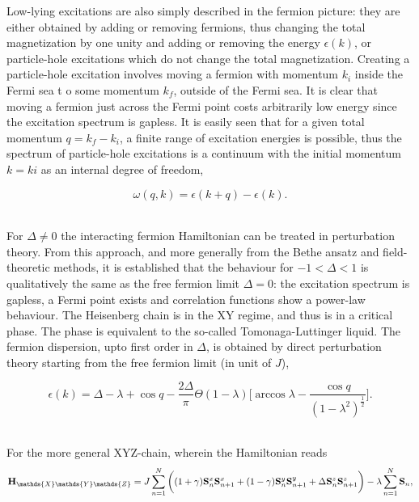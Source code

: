 \documentclass{homework}
\begin{document}
Low-lying excitations are also simply described in the fermion picture: they are either obtained by adding or removing fermions, thus changing the total magnetization by one unity and adding or removing the energy $\epsilon(k)$, or particle-hole excitations which do not change the total magnetization. Creating a particle-hole excitation involves moving a fermion with momentum $k_i$ inside the Fermi sea t o some momentum $k_f$, outside of the Fermi sea. It is clear that moving a fermion just across the Fermi point costs arbitrarily low energy since the excitation spectrum is gapless. It is easily seen that for a given total momentum $q = k_f - k_i$, a finite range of excitation energies is possible, thus the spectrum of particle-hole excitations is a continuum with the initial momentum $k=ki$ as an internal degree of freedom,

$$
    \omega(q,k) = \epsilon(k+q) - \epsilon(k).
$$

\blanky \\

For $\Delta \neq 0$ the interacting fermion Hamiltonian can be treated in perturbation theory. From this approach, and more generally from the Bethe ansatz and field-theoretic methods, it is established that the behaviour for $-1 < \Delta < 1$ is qualitatively the same as the free fermion limit $\Delta = 0$: the excitation spectrum is gapless, a Fermi point exists and correlation functions show a power-law behaviour. The Heisenberg chain is in the XY regime, and thus is in a critical phase. The phase is equivalent to the so-called Tomonaga-Luttinger liquid. The fermion dispersion, upto first order in $\Delta$, is obtained by direct perturbation theory starting from the free fermion limit (in unit of $J$), 

\begin{equation*}
    \epsilon(k) = \Delta - \lambda + \cos q - \frac{2\Delta}{\pi} \Theta(1-\lambda) \bigg[\arccos \lambda - \frac{\cos q}{(1-\lambda^2)^{\frac{1}{2}}}\bigg].
\end{equation*}

\blanky \\

For the more general XYZ-chain, wherein the Hamiltonian reads 
\begin{equation}
    \Hamiltonian_{\mathds{X}\mathds{Y}\mathds{Z}} = J \sum_{n=1}^{N} \bigg( (1+\gamma) \spin^{x}_{n} \spin^{x}_{n+1} + (1-\gamma) \spin^{y}_{n} \spin^{y}_{n+1} + \Delta \spin^{z}_{n} \spin_{n+1}^{z} \bigg) - \lambda \sum_{n=1}^{N} {\spin}_n,
\end{equation}
\end{document}

